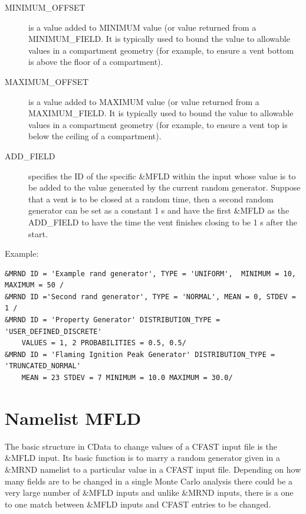 \documentclass[12pt,twoside]{book}
\begin{document}
\begin{description}
  \item[MINIMUM\_OFFSET] is a value added to {\ct MINIMUM} value (or value returned from a {\ct MINIMUM\_FIELD}. It is typically used to bound the value to allowable values in a compartment geometry (for example, to ensure a vent bottom is above the floor of a compartment).
  \item[MAXIMUM\_OFFSET] is a value added to {\ct MAXIMUM} value (or value returned from a {\ct MAXIMUM\_FIELD}. It is typically used to bound the value to allowable values in a compartment geometry (for example, to ensure a vent top is below the ceiling of a compartment).
  \item[ADD\_FIELD] specifies the  ID of the specific \&MFLD  within the input whose value is to be added to the value generated by the current random generator. Suppose that a vent is to be closed at a random time, then a second random generator can be set as a constant 1 s and have the first \&MFLD as the ADD\_FIELD  to have the time the vent finishes closing to be 1 s after the start.
\end{description}

\vspace{\baselineskip}
\noindent Example:
\begin{lstlisting}[language=cdata, basicstyle=\scriptsize]
&MRND ID = 'Example rand generator', TYPE = 'UNIFORM',  MINIMUM = 10, MAXIMUM = 50 /
&MRND ID ='Second rand generator', TYPE = 'NORMAL', MEAN = 0, STDEV = 1 /
&MRND ID = 'Property Generator' DISTRIBUTION_TYPE = 'USER_DEFINED_DISCRETE'
    VALUES = 1, 2 PROBABILITIES = 0.5, 0.5/
&MRND ID = 'Flaming Ignition Peak Generator' DISTRIBUTION_TYPE = 'TRUNCATED_NORMAL'
    MEAN = 23 STDEV = 7 MINIMUM = 10.0 MAXIMUM = 30.0/
\end{lstlisting}

\section{Namelist MFLD}
\label{info:MFLD}

The basic structure in CData to change values of a CFAST input file is the { \ct \&MFLD} input. Its basic function is to marry a random generator given in a { \ct \&MRND} namelist to a particular value in a CFAST input file. Depending on how many fields are to be changed in a single Monte Carlo analysis there could be a very large number of { \ct \&MFLD} inputs and unlike { \ct \&MRND } inputs, there is a one to one match between { \ct \&MFLD} inputs and CFAST entries to be changed.
\end{document}
